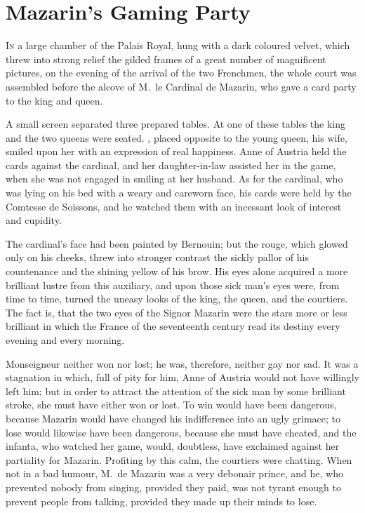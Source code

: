 \chapter{Mazarin's Gaming Party}

\lettrine{I}{n} a large chamber of the Palais Royal, hung with a dark coloured velvet, which threw into strong relief the gilded frames of a great number of magnificent pictures, on the evening of the arrival of the two Frenchmen, the whole court was assembled before the alcove of M.~le Cardinal de Mazarin, who gave a card party to the king and queen.

A small screen separated three prepared tables. At one of these tables the king and the two queens were seated. , placed opposite to the young queen, his wife, smiled upon her with an expression of real happiness. Anne of Austria held the cards against the cardinal, and her daughter-in-law assisted her in the game, when she was not engaged in smiling at her husband. As for the cardinal, who was lying on his bed with a weary and careworn face, his cards were held by the Comtesse de Soissons, and he watched them with an incessant look of interest and cupidity.

The cardinal's face had been painted by Bernouin; but the rouge, which glowed only on his cheeks, threw into stronger contrast the sickly pallor of his countenance and the shining yellow of his brow. His eyes alone acquired a more brilliant lustre from this auxiliary, and upon those sick man's eyes were, from time to time, turned the uneasy looks of the king, the queen, and the courtiers. The fact is, that the two eyes of the Signor Mazarin were the stars more or less brilliant in which the France of the seventeenth century read its destiny every evening and every morning.

Monseigneur neither won nor lost; he was, therefore, neither gay nor sad. It was a stagnation in which, full of pity for him, Anne of Austria would not have willingly left him; but in order to attract the attention of the sick man by some brilliant stroke, she must have either won or lost. To win would have been dangerous, because Mazarin would have changed his indifference into an ugly grimace; to lose would likewise have been dangerous, because she must have cheated, and the infanta, who watched her game, would, doubtless, have exclaimed against her partiality for Mazarin. Profiting by this calm, the courtiers were chatting. When not in a bad humour, M.~de Mazarin was a very debonair prince, and he, who prevented nobody from singing, provided they paid, was not tyrant enough to prevent people from talking, provided they made up their minds to lose.

